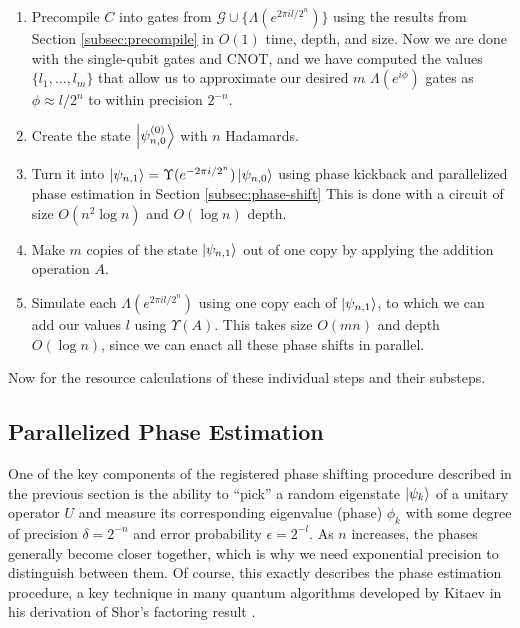 \begin{enumerate}
\item Precompile $C$ into gates from $\mathcal{G} \cup \{\Lambda(e^{2\pi i l / 2^n})\}$
using the results from Section \ref{subsec:precompile} in $O(1)$ time, depth,
and size.
Now we are done with the single-qubit gates and CNOT, and we have computed
the values $\{l_1, \ldots , l_m\}$ that allow us to approximate our
desired $m$
$\Lambda(e^{i\phi})$ gates as $\phi \approx l/2^n$ to within precision
$2^{-n}$.
\item Create the state $\left\vert{\psi^{(0)}_{n,0}}\right\rangle$ with $n$ Hadamards.
\item Turn it into $\left\vert{\psi_{n,1}}\right\rangle = \Upsilon(e^{-2\pi i / 2^n}) \left\vert{\psi_{n,0}}\right\rangle$
using phase kickback and parallelized phase estimation in Section \ref{subsec:phase-shift}
This is done with a circuit of size $O(n^2\log n)$ and $O(\log n)$ depth.
\item Make $m$ copies of the state $\left\vert{\psi_{n,1}}\right\rangle$ out of one copy by 
applying the addition operation $A$.
\item Simulate each $\Lambda(e^{2\pi i l / 2^n})$
using one copy each of $\left\vert{\psi_{n,1}}\right\rangle$, to which we can add our
values $l$ using $\Upsilon(A)$.
This takes size $O(mn)$ and depth $O(\log n)$, since we can enact
all these phase shifts in parallel.
\end{enumerate}

Now for the resource calculations of these individual steps and their
substeps.

\subsection{Parallelized Phase Estimation}
\label{subsec:ppe}

One of the key components of the registered phase shifting procedure
described in the previous section is the ability to ``pick'' a random
eigenstate $\left\vert{\psi_k}\right\rangle$ of a unitary operator $U$ and
measure its corresponding eigenvalue (phase) $\phi_k$
with some degree of precision $\delta = 2^{-n}$ and
error probability $\epsilon = 2^{-l}$. As $n$ increases, the phases
generally become closer together, which is why we need exponential precision
to distinguish between them.
Of course, this exactly describes the phase
estimation procedure, a key technique in many quantum algorithms developed
by Kitaev in his derivation of Shor's factoring result \cite{kitaev}.


